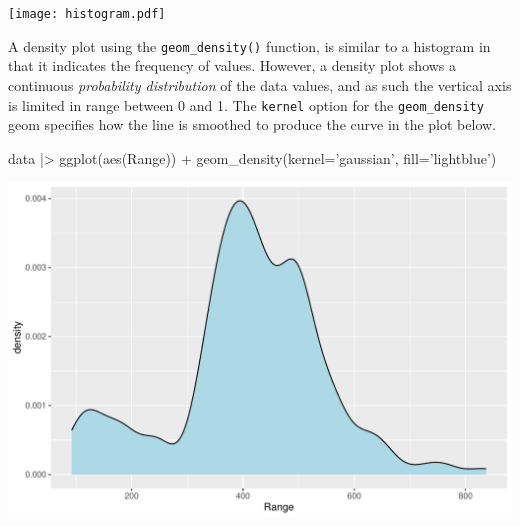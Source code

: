 \begin{center}
\texttt{[image: histogram.pdf]}
\end{center}

A density plot using the \texttt{geom\_density()} function, is similar to a histogram in that it indicates the frequency of values. However, a density plot shows a continuous \emph{probability distribution} of the data values, and as such the vertical axis is limited in range between 0 and 1. The \texttt{kernel} option for the \texttt{geom\_density} geom specifies how the line is smoothed to produce the curve in the plot below. 

\begin{Rcode}
data |> 
  ggplot(aes(Range)) + 
    geom_density(kernel='gaussian', fill='lightblue')
\end{Rcode}

\begin{center}
\includegraphics[width=.8\textwidth]{fuel.density.simple.pdf}
\end{center}


